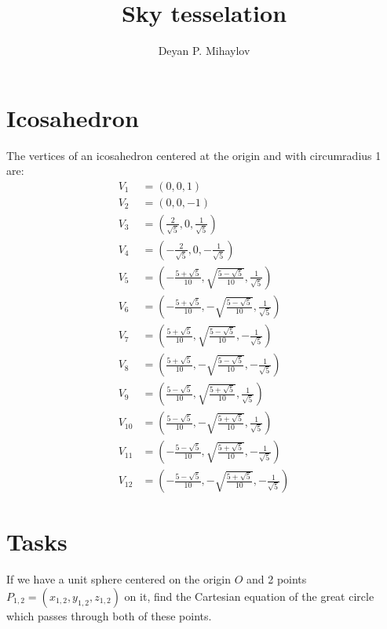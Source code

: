 \documentclass[author-year, prd, amsmath, amssymb, longbibliography, floatfix, reprint, superscriptaddress, a4]{revtex4-1}
\begin{document}

\title[Sky tesselation]{Sky tesselation}

\author{Deyan P. Mihaylov}

\maketitle

\section{Icosahedron}
The vertices of an icosahedron centered at the origin and with circumradius 1 are:
\begin{subequations}
    \begin{align}
    V_{1} &= (0, 0, 1) \\
    V_{2} &= (0, 0, -1) \\
    V_{3} &= \left(\frac{2}{\sqrt{5}}, 0, \frac{1}{\sqrt{5}}\right) \\
    V_{4} &= \left(-\frac{2}{\sqrt{5}}, 0, -\frac{1}{\sqrt{5}}\right) \\
    V_{5} &= \left(-\frac{5+\sqrt{5}}{10}, \sqrt{\frac{5-\sqrt{5}}{10}}, \frac{1}{\sqrt{5}}\right) \\
    V_{6} &= \left(-\frac{5+\sqrt{5}}{10}, -\sqrt{\frac{5-\sqrt{5}}{10}}, \frac{1}{\sqrt{5}}\right) \\
    V_{7} &= \left(\frac{5+\sqrt{5}}{10}, \sqrt{\frac{5-\sqrt{5}}{10}}, -\frac{1}{\sqrt{5}}\right) \\
    V_{8} &= \left(\frac{5+\sqrt{5}}{10}, -\sqrt{\frac{5-\sqrt{5}}{10}}, -\frac{1}{\sqrt{5}}\right) \\
    V_{9} &= \left(\frac{5-\sqrt{5}}{10}, \sqrt{\frac{5+\sqrt{5}}{10}}, \frac{1}{\sqrt{5}}\right) \\
    V_{10} &= \left(\frac{5-\sqrt{5}}{10}, -\sqrt{\frac{5+\sqrt{5}}{10}}, \frac{1}{\sqrt{5}}\right) \\
    V_{11} &= \left(-\frac{5-\sqrt{5}}{10}, \sqrt{\frac{5+\sqrt{5}}{10}}, -\frac{1}{\sqrt{5}}\right) \\
    V_{12} &= \left(-\frac{5-\sqrt{5}}{10}, -\sqrt{\frac{5+\sqrt{5}}{10}}, -\frac{1}{\sqrt{5}}\right)
    \end{align}
\end{subequations}

\section{Tasks}
\item If we have a unit sphere centered on the origin \(O\) and 2 points \(P_{1,2} = (x_{1,2}, y_{1,2}, z_{1,2})\) on it, find the
Cartesian equation of the great circle which passes through both of these points.
\end{document}
